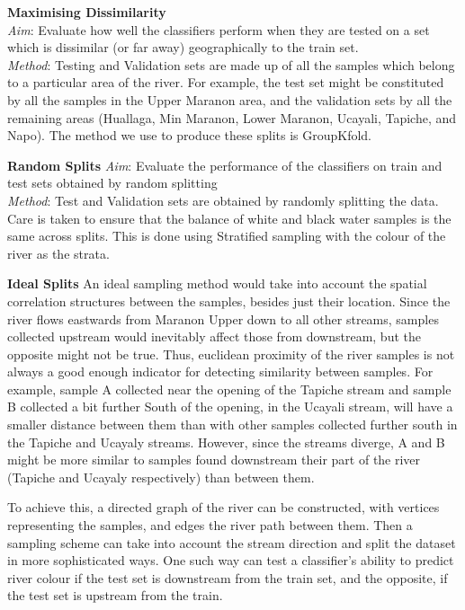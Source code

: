 { \large \bf Maximising Dissimilarity}\\
\textit{Aim}: Evaluate how well the classifiers perform when they are tested on a set which is dissimilar (or far away) geographically to the train set.\\
\textit{Method}: Testing and Validation sets are made up of all the samples which belong to a particular area of the river. For example, the test set might be constituted by all the samples in the Upper Maranon area, and the validation sets by all the remaining areas (Huallaga, Min Maranon, Lower Maranon, Ucayali, Tapiche, and Napo). The method we use to produce these splits is GroupKfold.

{\large \bf Random Splits}\newline
\textit{Aim}: Evaluate the performance of the classifiers on train and test sets obtained by random splitting \\
\textit{Method}: Test and Validation sets are obtained by randomly splitting the data. Care is taken to ensure that the balance of white and black water samples is the same across splits. This is done using Stratified sampling with the colour of the river as the strata.


{ \bf Ideal Splits}
An ideal sampling method would take into account the spatial correlation structures between the samples, besides just their location. Since the river flows eastwards from Maranon Upper down to all other streams, samples collected upstream would inevitably affect those from downstream, but the opposite might not be true. Thus, euclidean proximity of the river samples is not always a good enough indicator for detecting similarity between samples. For example, sample A collected near the opening of the Tapiche stream and sample B collected a bit further South of the opening, in the Ucayali stream, will have a smaller distance between them than with other samples collected further south in the Tapiche and Ucayaly streams. However, since the streams diverge, A and B might be more similar to samples found downstream their part of the river (Tapiche and Ucayaly respectively) than between them. 

To achieve this, a directed graph of the river can be constructed, with vertices representing the samples, and edges the river path between them. Then a sampling scheme can take into account the stream direction and split the dataset in more sophisticated ways. One such way can test a classifier's ability to predict river colour if the test set is downstream from the train set, and the opposite, if the test set is upstream from the train. 


